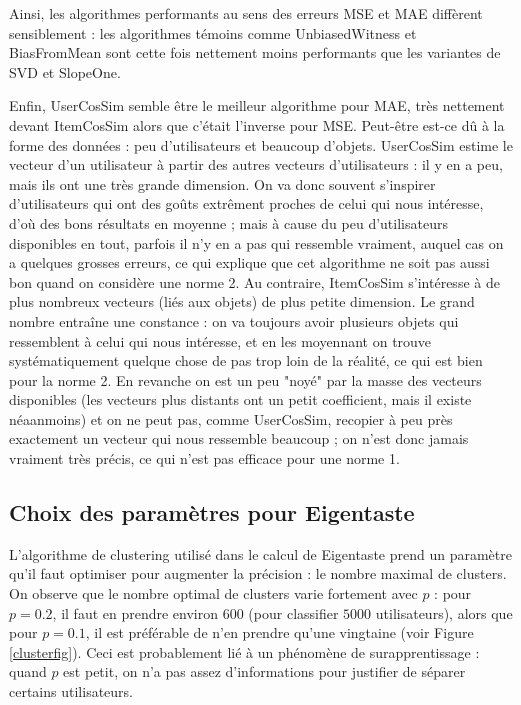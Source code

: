 \documentclass[11pt, openany, a4paper]{article}
\begin{document}
		Ainsi, les algorithmes performants au sens des erreurs MSE et MAE diffèrent sensiblement : les algorithmes témoins comme UnbiasedWitness et BiasFromMean sont cette fois nettement moins performants que les variantes de SVD et SlopeOne. 
		
		Enfin, UserCosSim semble être le meilleur algorithme pour MAE, très nettement devant ItemCosSim alors que c'était l'inverse pour MSE. Peut-être est-ce dû à la forme des données : peu d'utilisateurs et beaucoup d'objets. UserCosSim estime le vecteur d'un utilisateur à partir des autres vecteurs d'utilisateurs : il y en a peu, mais ils ont une très grande dimension. On va donc souvent s'inspirer d'utilisateurs qui ont des goûts extrêment proches de celui qui nous intéresse, d'où des bons résultats en moyenne ; mais à cause du peu d'utilisateurs disponibles en tout, parfois il n'y en a pas qui ressemble vraiment, auquel cas on a quelques grosses erreurs, ce qui explique que cet algorithme ne soit pas aussi bon quand on considère une norme 2. Au contraire, ItemCosSim s'intéresse à de plus nombreux vecteurs (liés aux objets) de plus petite dimension. Le grand nombre entraîne une constance : on va toujours avoir plusieurs objets qui ressemblent à celui qui nous intéresse, et en les moyennant on trouve systématiquement quelque chose de pas trop loin de la réalité, ce qui est bien pour la norme 2. En revanche on est un peu "noyé" par la masse des vecteurs disponibles (les vecteurs plus distants ont un petit coefficient, mais il existe néaanmoins) et on ne peut pas, comme UserCosSim, recopier à peu près exactement un vecteur qui nous ressemble beaucoup ; on n'est donc jamais vraiment très précis, ce qui n'est pas efficace pour une norme 1.
		
		
		
		
	\subsection{Choix des paramètres pour Eigentaste}
	
		L'algorithme de clustering utilisé dans le calcul de Eigentaste prend un paramètre qu'il faut optimiser pour augmenter la précision : le nombre maximal de clusters. On observe que le nombre optimal de clusters varie fortement avec $p$ : pour $p=0.2$, il faut en prendre environ $600$ (pour classifier $5000$ utilisateurs), alors que pour $p=0.1$, il est préférable de n'en prendre qu'une vingtaine (voir Figure \ref{clusterfig}). Ceci est probablement lié à un phénomène de surapprentissage : quand $p$ est petit, on n'a pas assez d'informations pour justifier de séparer certains utilisateurs.
		
\end{document}
